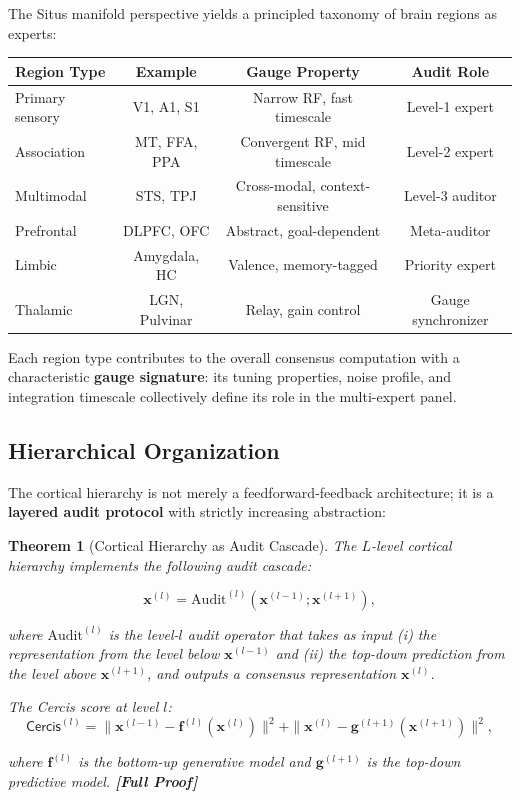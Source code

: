 \documentclass[12pt,a4paper]{article}
\newtheorem{theorem}{Theorem}[section]
\theoremstyle{remark}
\newcommand{\Cercis}{\textsf{Cercis}}
\newcommand{\rigorFull}{\textbf{[Full Proof]}}
\begin{document}
The Situs manifold perspective yields a principled taxonomy of brain regions
as experts:

\begin{center}
\begin{tabular}{lccc}
\toprule
\textbf{Region Type} & \textbf{Example} & \textbf{Gauge Property} & \textbf{Audit Role} \\
\midrule
Primary sensory & V1, A1, S1 & Narrow RF, fast timescale & Level-1 expert \\
Association    & MT, FFA, PPA  & Convergent RF, mid timescale & Level-2 expert \\
Multimodal     & STS, TPJ      & Cross-modal, context-sensitive & Level-3 auditor \\
Prefrontal     & DLPFC, OFC    & Abstract, goal-dependent & Meta-auditor \\
Limbic         & Amygdala, HC  & Valence, memory-tagged & Priority expert \\
Thalamic       & LGN, Pulvinar & Relay, gain control & Gauge synchronizer \\
\bottomrule
\end{tabular}
\end{center}

Each region type contributes to the overall consensus computation with a
characteristic \textbf{gauge signature}: its tuning properties, noise profile,
and integration timescale collectively define its role in the multi-expert
panel.

\subsection{Hierarchical Organization}

The cortical hierarchy is not merely a feedforward-feedback architecture; it
is a \textbf{layered audit protocol} with strictly increasing abstraction:

\begin{theorem}[Cortical Hierarchy as Audit Cascade]\label{thm:cortical-hierarchy}
The $L$-level cortical hierarchy implements the following audit cascade:

\begin{equation}\label{eq:audit-cascade}
    \mathbf{x}^{(l)} = \text{Audit}^{(l)}\left(\mathbf{x}^{(l-1)}; \mathbf{x}^{(l+1)}\right),
\end{equation}

where $\text{Audit}^{(l)}$ is the level-$l$ audit operator that takes as
input (i) the representation from the level below $\mathbf{x}^{(l-1)}$ and
(ii) the top-down prediction from the level above $\mathbf{x}^{(l+1)}$, and
outputs a consensus representation $\mathbf{x}^{(l)}$.

The \Cercis{} score at level $l$:
\begin{equation}\label{eq:level-cercis}
    \Cercis^{(l)} = \|\mathbf{x}^{(l-1)} - \mathbf{f}^{(l)}(\mathbf{x}^{(l)})\|^2 + \|\mathbf{x}^{(l)} - \mathbf{g}^{(l+1)}(\mathbf{x}^{(l+1)})\|^2,
\end{equation}

where $\mathbf{f}^{(l)}$ is the bottom-up generative model and
$\mathbf{g}^{(l+1)}$ is the top-down predictive model. \rigorFull
\end{theorem}
\end{document}
